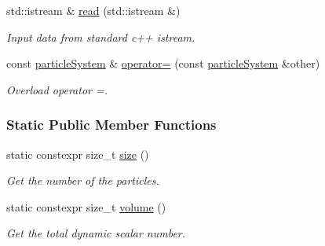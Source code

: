 \begin{DoxyCompactItemize}
std\+::istream \& \mbox{\hyperlink{classparticle_system_ade26a52e1b5eae4ba5e37a3e4a3b9cd4}{read}} (std\+::istream \&)
\begin{DoxyCompactList}\small\item\em Input data from standard c++ istream. \end{DoxyCompactList}\item 
const \mbox{\hyperlink{classparticle_system}{particle\+System}} \& \mbox{\hyperlink{classparticle_system_a95f991ac50fde37e7c57dd6feca1e358}{operator=}} (const \mbox{\hyperlink{classparticle_system}{particle\+System}} \&other)
\begin{DoxyCompactList}\small\item\em Overload operator =. \end{DoxyCompactList}\end{DoxyCompactItemize}
\subsubsection*{Static Public Member Functions}
\begin{DoxyCompactItemize}
\item 
static constexpr size\+\_\+t \mbox{\hyperlink{classparticle_system_add9db06ecfc4ba31291641c5b2157764}{size}} ()
\begin{DoxyCompactList}\small\item\em Get the number of the particles. \end{DoxyCompactList}\item 
static constexpr size\+\_\+t \mbox{\hyperlink{classparticle_system_aac9e6701e4486c89b508a2508b77089b}{volume}} ()
\begin{DoxyCompactList}\small\item\em Get the total dynamic scalar number. \end{DoxyCompactList}\end{DoxyCompactItemize}

